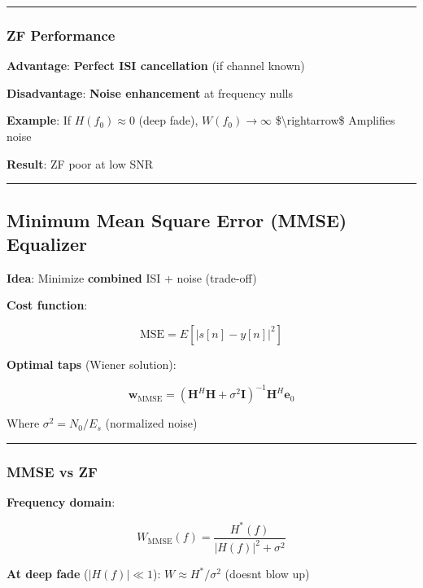 \begin{center}\rule{0.5\linewidth}{0.5pt}\end{center}

\subsubsection{ZF Performance}\label{zf-performance}

\textbf{Advantage}: \textbf{Perfect ISI cancellation} (if channel known)

\textbf{Disadvantage}: \textbf{Noise enhancement} at frequency nulls

\textbf{Example}: If \(H(f_0) \approx 0\) (deep fade),
\(W(f_0) \to \infty\) \$\textbackslash rightarrow\$ Amplifies noise

\textbf{Result}: ZF poor at low SNR

\begin{center}\rule{0.5\linewidth}{0.5pt}\end{center}

\subsection{Minimum Mean Square Error (MMSE)
Equalizer}\label{minimum-mean-square-error-mmse-equalizer}

\textbf{Idea}: Minimize \textbf{combined} ISI + noise (trade-off)

\textbf{Cost function}:

\[
\text{MSE} = E[|s[n] - y[n]|^2]
\]

\textbf{Optimal taps} (Wiener solution):

\[
\mathbf{w}_{\text{MMSE}} = (\mathbf{H}^H \mathbf{H} + \sigma^2 \mathbf{I})^{-1} \mathbf{H}^H \mathbf{e}_0
\]

Where \(\sigma^2 = N_0/E_s\) (normalized noise)

\begin{center}\rule{0.5\linewidth}{0.5pt}\end{center}

\subsubsection{MMSE vs ZF}\label{mmse-vs-zf}

\textbf{Frequency domain}:

\[
W_{\text{MMSE}}(f) = \frac{H^*(f)}{|H(f)|^2 + \sigma^2}
\]

\textbf{At deep fade} (\(|H(f)| \ll 1\)): \(W \approx H^*/\sigma^2\)
(doesn\textquotesingle t blow up)

